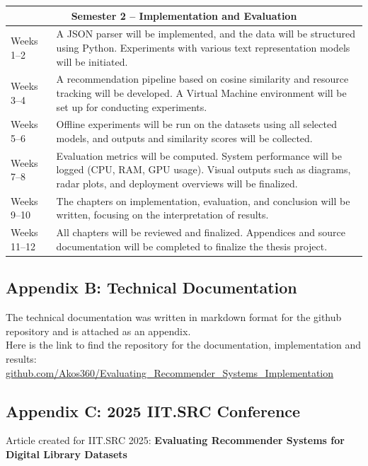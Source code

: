 \documentclass[\myFontSize,a4paper,oneside,hidelinks]{article}
\begin{document}
\begin{longtable}{|p{2.5cm}|p{12cm}|}
\multicolumn{2}{|c|}{\textbf{Semester 2 – Implementation and Evaluation}} \\
\hline
Weeks 1--2 & A JSON parser will be implemented, and the data will be structured using Python. Experiments with various text representation models will be initiated. \\
\hline
Weeks 3--4 & A recommendation pipeline based on cosine similarity and resource tracking will be developed. A Virtual Machine environment will be set up for conducting experiments. \\
\hline
Weeks 5--6 & Offline experiments will be run on the datasets using all selected models, and outputs and similarity scores will be collected. \\
\hline
Weeks 7--8 & Evaluation metrics will be computed. System performance will be logged (CPU, RAM, GPU usage). Visual outputs such as diagrams, radar plots, and deployment overviews will be finalized. \\
\hline
Weeks 9--10 & The chapters on implementation, evaluation, and conclusion will be written, focusing on the interpretation of results. \\
\hline
Weeks 11--12 & All chapters will be reviewed and finalized. Appendices and source documentation will be completed to finalize the thesis project. \\
\hline
\end{longtable}


\clearpage
\renewcommand{\thepage}{B-\arabic{page}}
\setcounter{page}{1}
\subsection*{Appendix B: Technical Documentation} %
\renewcommand{\refname}{}
The technical documentation was written in markdown format for the github repository and is attached as an appendix.\\
Here is the link to find the repository for the documentation, implementation and results: \\
\href{https://github.com/Akos360/Evaluating\_Recommender\_Systems\_Implementation.git}{github.com/Akos360/Evaluating\_Recommender\_Systems\_Implementation}
\clearpage
\renewcommand{\thepage}{C-\arabic{page}}
\setcounter{page}{1}
\subsection*{Appendix C: 2025 IIT.SRC Conference} 
\renewcommand{\refname}{}
Article created for IIT.SRC 2025: \textbf{Evaluating Recommender Systems for Digital Library Datasets}

\end{document}
